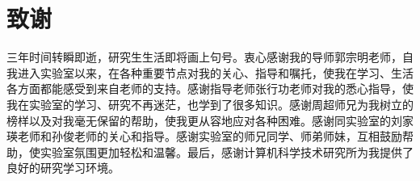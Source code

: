 %
%


%
%
\renewcommand{\baselinestretch}{1.5}
\fontsize{12pt}{13pt}\selectfont

\chapter*{致谢}
{}

三年时间转瞬即逝，研究生生活即将画上句号。衷心感谢我的导师郭宗明老师，自我进入实验室以来，在各种重要节点对我的关心、指导和嘱托，使我在学习、生活各方面都能感受到来自老师的支持。感谢指导老师张行功老师对我的悉心指导，使我在实验室的学习、研究不再迷茫，也学到了很多知识。感谢周超师兄为我树立的榜样以及对我毫无保留的帮助，使我更从容地应对各种困难。感谢同实验室的刘家瑛老师和孙俊老师的关心和指导。感谢实验室的师兄同学、师弟师妹，互相鼓励帮助，使实验室氛围更加轻松和温馨。最后，感谢计算机科学技术研究所为我提供了良好的研究学习环境。
